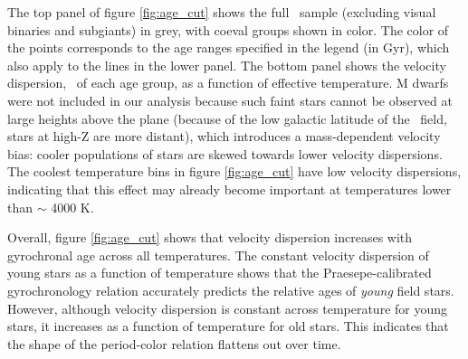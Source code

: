 The top panel of figure \ref{fig:age_cut} shows the full \mct\ sample
(excluding visual binaries and subgiants) in grey, with coeval groups shown in
color.
The color of the points corresponds to the age ranges specified in the legend
(in Gyr), which also apply to the lines in the lower panel.
The bottom panel shows the velocity dispersion, \sigmavb\ of each age group,
as a function of effective temperature.
M dwarfs were not included in our analysis because such faint stars cannot be
observed at large heights above the plane (because of the low galactic
latitude of the \kepler\ field, stars at high-Z are more distant), which
introduces a mass-dependent velocity bias: cooler populations of stars are
skewed towards lower velocity dispersions.
The coolest temperature bins in figure \ref{fig:age_cut} have low velocity
dispersions, indicating that this effect may already become important at
temperatures lower than $\sim$ 4000 K.

Overall, figure \ref{fig:age_cut} shows that velocity dispersion increases
with gyrochronal age across all temperatures.
The constant velocity dispersion of young stars as a function of temperature
shows that the Praesepe-calibrated gyrochronology relation accurately predicts
the relative ages of {\it young} field stars.
However, although velocity dispersion is constant across temperature for young
stars, it increases as a function of temperature for old stars.
This indicates that the shape of the period-color relation flattens out over
time.


